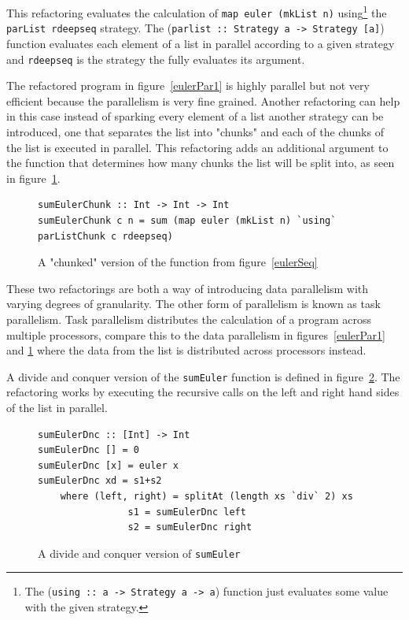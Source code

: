 This refactoring evaluates the calculation of \texttt{map euler (mkList n)} using\footnote{The (\texttt{using :: a -> Strategy a -> a}) function just evaluates some value with the given strategy.} the \texttt{parList rdeepseq} strategy. The (\texttt{parlist :: Strategy a -> Strategy [a]}) function evaluates each element of a list in parallel according to a given strategy and \texttt{rdeepseq} is the strategy the fully evaluates its argument. 
  
The refactored program in figure~\ref{eulerPar1} is highly parallel but not very efficient because the parallelism is very fine grained. Another refactoring can help in this case instead of sparking every element of a list another strategy can be introduced, one that separates the list into "chunks" and each of the chunks of the list is executed in parallel. This refactoring adds an additional argument to the function that determines how many chunks the list will be split into, as seen in figure~\ref{eulerChunk}.
  
\begin{figure}[t]\label{eulerChunk}
\begin{lstlisting}
sumEulerChunk :: Int -> Int -> Int
sumEulerChunk c n = sum (map euler (mkList n) `using` parListChunk c rdeepseq)
\end{lstlisting}
\caption{A "chunked" version of the function from figure~\ref{eulerSeq}}
\end{figure}  

These two refactorings are both a way of introducing data parallelism with varying degrees of granularity. The other form of parallelism is known as task parallelism. Task parallelism distributes the calculation of a program across multiple processors, compare this to the data parallelism in figures~\ref{eulerPar1} and \ref{eulerChunk} where the data from the list is distributed across processors instead. 

A divide and conquer version of the \texttt{sumEuler} function is defined in figure~\ref{dncEuler}. The refactoring works by executing the recursive calls on the left and right hand sides of the list in parallel. 

\begin{figure}[t]\label{dncEuler}
\begin{lstlisting}
sumEulerDnc :: [Int] -> Int
sumEulerDnc [] = 0
sumEulerDnc [x] = euler x
sumEulerDnc xd = s1+s2
	where (left, right) = splitAt (length xs `div` 2) xs
				s1 = sumEulerDnc left
				s2 = sumEulerDnc right
\end{lstlisting}
\caption{A divide and conquer version of \texttt{sumEuler}}
\end{figure}

